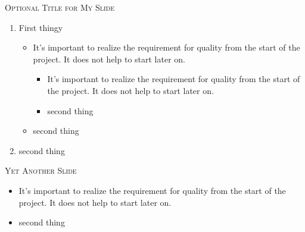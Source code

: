 \documentclass[xcolor=x11names,compress]{beamer}
\newcommand{\highlightcolor}{DeepSkyBlue4}
\renewcommand{\(}{\begin{columns}}
\renewcommand{\)}{\end{columns}}
\newcommand{\<}[1]{\begin{column}{#1}}
\renewcommand{\>}{\end{column}}
\newcommand{\cemph}[1]{\textcolor{\highlightcolor}{#1}}
\renewcommand\frametitle[1]{{\textsc{\Large \textcolor{\highlightcolor}{#1}}}\vspace{0.6cm}\par}
\begin{document}
\begin{frame}[t] %

\frametitle{Optional Title for My Slide}



\begin{enumerate} 
\item First thingy
\begin{itemize} 
\item It's important to realize the requirement for quality from the start of the project. It does \cemph{not} help to start later on. 
\begin{itemize} 
\item It's important to realize the requirement for quality from the start of the project. It does \cemph{not} help to start later on. 
\item second thing
\end{itemize}
\item second thing
\end{itemize}
\item second thing
\end{enumerate}

\end{frame}
\begin{frame}[t] %
\frametitle{Yet Another Slide}
\begin{itemize} 
\item It's important to realize the requirement for quality from the start of the project. It does \cemph{not} help to start later on. 
\pause
\item second thing
\end{itemize}
\end{frame}
\end{document}
